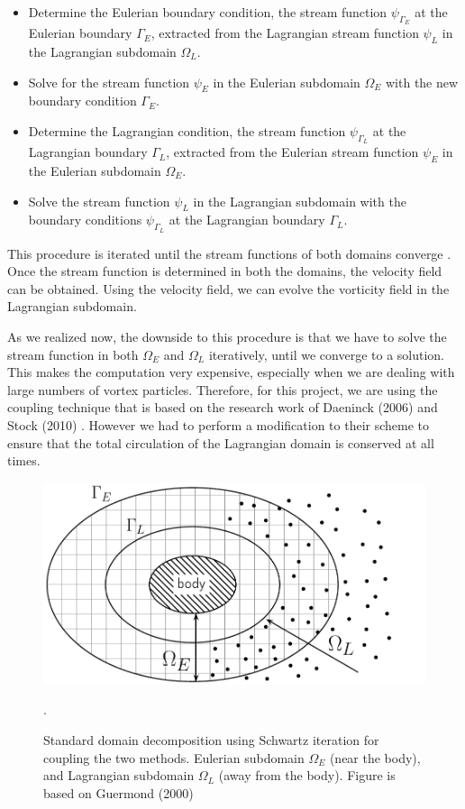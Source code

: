 		\begin{itemize}
		\item Determine the Eulerian boundary condition, the stream function $\psi_{\Gamma_E}$ at the Eulerian boundary $\Gamma_E$, extracted from the Lagrangian stream function $\psi_L$ in the Lagrangian subdomain $\Omega_L$.
		\item Solve for the stream function $\psi_E$ in the Eulerian subdomain $\Omega_E$ with the new boundary condition $\Gamma_E$.
		\item Determine the Lagrangian condition, the stream function $\psi_{\Gamma_L}$ at the Lagrangian boundary $\Gamma_L$, extracted from the Eulerian stream function $\psi_E$ in the Eulerian subdomain $\Omega_E$.
		\item Solve the stream function $\psi_L$ in the Lagrangian subdomain with the boundary conditions $\psi_{\Gamma_L}$ at the Lagrangian boundary $\Gamma_L$.
		\end{itemize}
	
	This procedure is iterated until the stream functions of both domains converge \cite{Ould-Salihi2001a}. Once the stream function is determined in both the domains, the velocity field can be obtained. Using the velocity field, we can evolve the vorticity field in the Lagrangian subdomain.

	As we realized now, the downside to this procedure is that we have to solve the stream function in both $\Omega_E$ and $\Omega_L$ iteratively, until we converge to a solution. This makes the computation very expensive, especially when we are dealing with large numbers of vortex particles. Therefore, for this project, we are using the coupling technique that is based on the research work of Daeninck (2006) \cite{Daeninck2006} and Stock (2010) \cite{Stock2010a}. However we had to perform a modification to their scheme to ensure that the total circulation of the Lagrangian domain is conserved at all times.
	
		\begin{figure}[!t]
			\centering
			\includegraphics[width=0.6\linewidth]{figures/introduction/domainDecomposition_typical_type2.pdf}
			\caption{Standard domain decomposition using Schwartz iteration for coupling the two methods. Eulerian subdomain $\Omega_E$ (near the body), and Lagrangian subdomain $\Omega_L$ (away from the body). Figure is based on Guermond (2000) \cite{Guermond2000a}}.
			\label{fig:domainDecomposition}
		\end{figure}

